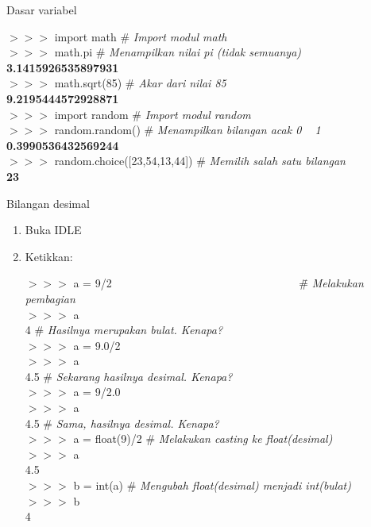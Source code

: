 \begin{panduan}{Dasar variabel}
\begin{enumerate}
\begin{IDLE}
\begin{tabbing}
		$>>>$ import math \> \# \textit{Import modul math}\\
		$>>>$ math.pi \> \# \textit{Menampilkan nilai pi (tidak semuanya)}\\
		\textbf{3.1415926535897931}\\
		$>>>$ math.sqrt(85) \> \# \textit{Akar dari nilai 85}\\
		\textbf{9.2195444572928871} \\
		$>>>$ import random \> \# \textit{Import modul random}\\
		$>>>$ random.random() \> \# \textit{Menampilkan bilangan acak 0 ~ 1}\\
		\textbf{0.3990536432569244}\\
		$>>>$ random.choice([23,54,13,44]) \> \# \textit{Memilih salah satu bilangan}\\
		\textbf{23}\\
		\end{tabbing}
	\end{IDLE}
\end{enumerate}
\end{panduan}


\begin{panduan}{Bilangan desimal}
\begin{enumerate}
	\item Buka IDLE
	\item Ketikkan:
	\begin{IDLE}
		\begin{tabbing}
			$>>>$ a = 9/2~~~~~~~~~~~~~~~~~~~~~~~~~~~~~~~~~ \= \# \textit{Melakukan pembagian}\\
			$>>>$ a \\
			4 \> \# \textit{Hasilnya merupakan bulat. Kenapa?}\\
			$>>>$  a = 9.0/2 \\
			$>>>$ a \\
			4.5 \> \# \textit{Sekarang hasilnya desimal. Kenapa?}\\
			$>>>$ a = 9/2.0 \\
			$>>>$ a \\
			4.5 \> \# \textit{Sama, hasilnya desimal. Kenapa?}\\
			$>>>$ a = float(9)/2 \> \# \textit{Melakukan casting ke float(desimal)}\\
			$>>>$ a \\
			4.5 \\
			$>>>$ b = int(a) \> \# \textit{Mengubah float(desimal) menjadi int(bulat)}\\
			$>>>$ b \\
			4\\ 
		\end{tabbing}
	\end{IDLE}
\end{enumerate}
\end{panduan}

